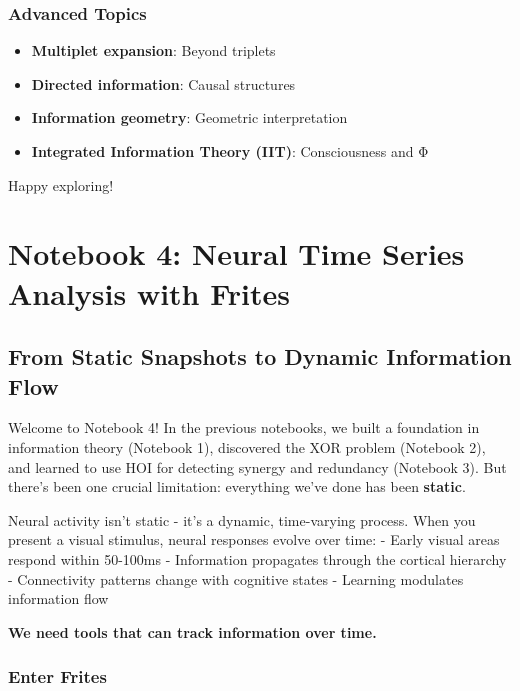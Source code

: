 \documentclass[
  11pt,
  letterpaper,
  oneside,
  openany]{book}
\providecommand{\tightlist}{%
  \setlength{\itemsep}{0pt}\setlength{\parskip}{0pt}}
\begin{document}
\subsection{Advanced Topics}\label{advanced-topics-1}

\begin{itemize}
\tightlist
\item
  \textbf{Multiplet expansion}: Beyond triplets
\item
  \textbf{Directed information}: Causal structures
\item
  \textbf{Information geometry}: Geometric interpretation
\item
  \textbf{Integrated Information Theory (IIT)}: Consciousness and Φ
\end{itemize}

Happy exploring! 🎉

\chapter{Notebook 4: Neural Time Series Analysis with
Frites}\label{notebook-4-neural-time-series-analysis-with-frites}

\section{From Static Snapshots to Dynamic Information
Flow}\label{from-static-snapshots-to-dynamic-information-flow}

Welcome to Notebook 4! In the previous notebooks, we built a foundation
in information theory (Notebook 1), discovered the XOR problem (Notebook
2), and learned to use HOI for detecting synergy and redundancy
(Notebook 3). But there's been one crucial limitation: everything we've
done has been \textbf{static}.

Neural activity isn't static - it's a dynamic, time-varying process.
When you present a visual stimulus, neural responses evolve over time: -
Early visual areas respond within 50-100ms - Information propagates
through the cortical hierarchy - Connectivity patterns change with
cognitive states - Learning modulates information flow

\textbf{We need tools that can track information over time.}

\subsection{Enter Frites}\label{enter-frites}
\end{document}
